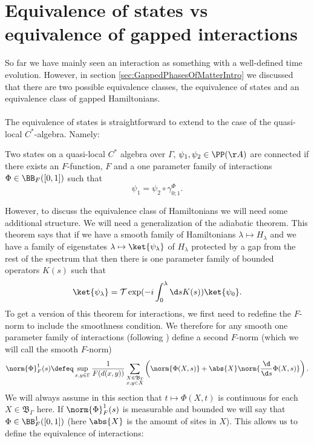 \section{Equivalence of states vs equivalence of gapped interactions}\label{sec:equivalence-of-states-vs-equivalence-of-gapped-interactions}
So far we have mainly seen an interaction as something with a well-defined time evolution. However, in section \ref{sec:GappedPhasesOfMatterIntro} we discussed that there are two possible equivalence classes, the equivalence of states and an equivalence class of gapped Hamiltonians.
\\\\
The equivalence of states is straightforward to extend to the case of the quasi-local $C^*$-algebra. Namely:
\begin{definition}\label{def:EquivalenceOfStates}
	Two states on a quasi-local $C^*$ algebra over $\Gamma$, $\psi_1,\psi_2\in\PP(\AA)$ are connected if there exists an $F$-function, $F$ and a one parameter family of interactions $\Phi\in\BB_{F}([0,1])$ such that
	\begin{equation}
		\psi_1=\psi_2\circ\gamma^\Phi_{0;1}.
	\end{equation}
\end{definition}
However, to discuss the equivalence class of Hamiltonians we will need some additional structure. We will need a generalization of the adiabatic theorem. This theorem says that if we have a smooth family of Hamiltonians $\lambda\mapsto H_\lambda$ and we have a family of eigenstates $\lambda\mapsto\ket{\psi_\lambda}$ of $H_\lambda$ protected by a gap from the rest of the spectrum that then there is one parameter family of bounded operators $K(s)$ such that
\begin{equation}
	\ket{\psi_\lambda}=\mathcal{T}\exp(-i\int_0^\lambda\d s K(s))\ket{\psi_0}.
\end{equation}
To get a version of this theorem for interactions, we first need to redefine the $F$-norm to include the smoothness condition. We therefore for any smooth one parameter family of interactions (following \cite{nachtergaele2019quasi}) define a second $F$-norm (which we will call the smooth $F$-norm)
\begin{equation}
	\norm{\Phi}_{F}^1 (s)\defeq \sup_{x,y\in \Gamma} \frac{1}{F(d(x,y))}\sum_{\substack{X\in\mathfrak{B}_\Gamma \\ x,y\in X}}\left(\norm{\Phi(X,s)}+\abs{X}\norm{\frac{\d}{\d s}\Phi(X,s)}\right).
\end{equation}
We will always assume in this section that $t\mapsto \Phi(X,t)$ is continuous for each $X\in\mathfrak{B}_\Gamma$ here. If $\norm{\Phi}_{F}^1 (s)$ is measurable and bounded we will say that $\Phi\in\BB^1_F([0,1])$ (here $\abs{X}$ is the amount of sites in $X$). This allows us to define the equivalence of interactions:
